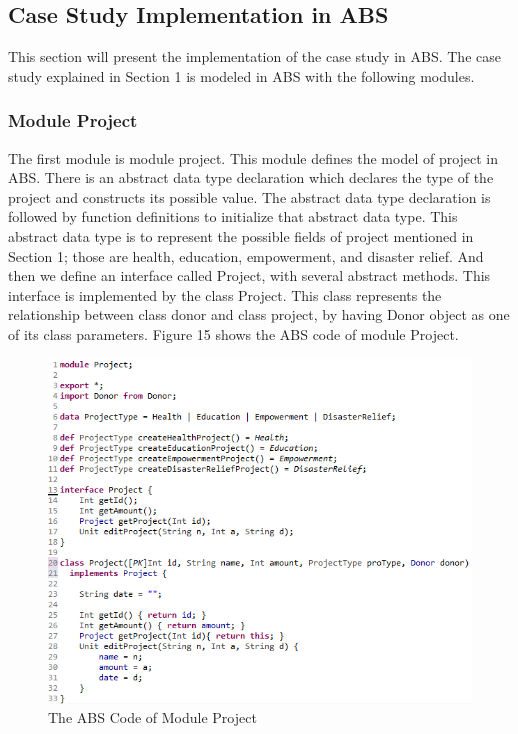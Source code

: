 \documentclass[runningheads,a4paper]{llncs}
\begin{document}
\subsection{Case Study Implementation in ABS}
This section will present the implementation of the case study in ABS.  The case study explained in Section 1 is modeled in ABS with the following modules.

\subsubsection{Module Project}
The first module is module project. This module defines the model of project in ABS. There is an abstract data type declaration which declares the type of the project and constructs its possible value. The abstract data type declaration is followed by function definitions to initialize that abstract data type. This abstract data type is to represent the possible fields of project mentioned in Section 1; those are health, education, empowerment, and disaster relief. And then we define an interface called Project, with several abstract methods. This interface is implemented by the class Project. This class represents the relationship between class donor and class project, by having Donor object as one of its class parameters. Figure 15 shows the ABS code of module Project.

\begin{figure}
	\centering
	\includegraphics[scale=0.7]{code1.png}
	\caption{The ABS Code of Module Project}
	\label{Figure 15}
\end{figure}
\end{document}
